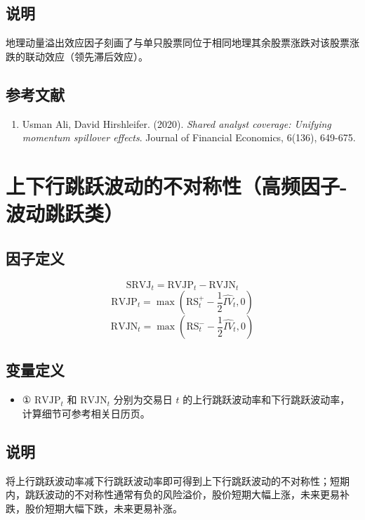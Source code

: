\documentclass{article}
\begin{document}
\subsection{说明}
地理动量溢出效应因子刻画了与单只股票同位于相同地理其余股票涨跌对该股票涨跌的联动效应（领先滞后效应）。

\subsection{参考文献}
\begin{enumerate}
    \item Usman Ali, David Hirshleifer. (2020). \textit{Shared analyst coverage: Unifying momentum spillover effects}. Journal of Financial Economics, 6(136), 649-675.
\end{enumerate}

\section{上下行跳跃波动的不对称性（高频因子-波动跳跃类）}

\subsection{因子定义}

\begin{equation}
    \mathrm{SRVJ}_t = \mathrm{RVJP}_t - \mathrm{RVJN}_t
\end{equation}
\begin{equation}
    \mathrm{RVJP}_t = \max\left(\mathrm{RS}^+_t - \frac{1}{2}\hat{IV}_t, 0\right)
\end{equation}
\begin{equation}
    \mathrm{RVJN}_t = \max\left(\mathrm{RS}^-_t - \frac{1}{2}\hat{IV}_t, 0\right)
\end{equation}

\subsection{变量定义}
\begin{itemize}
    \item ① \( \mathrm{RVJP}_t \) 和 \( \mathrm{RVJN}_t \) 分别为交易日 \( t \) 的上行跳跃波动率和下行跳跃波动率，计算细节可参考相关日历页。
\end{itemize}

\subsection{说明}
将上行跳跃波动率减下行跳跃波动率即可得到上下行跳跃波动的不对称性；短期内，跳跃波动的不对称性通常有负的风险溢价，股价短期大幅上涨，未来更易补跌，股价短期大幅下跌，未来更易补涨。
\end{document}
